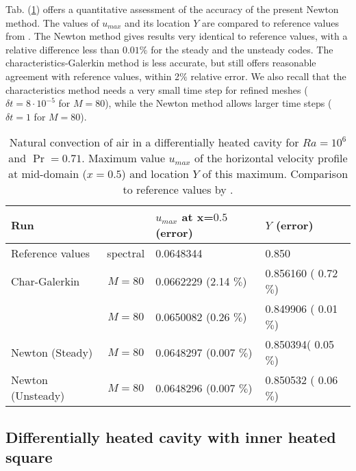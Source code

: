 Tab. (\ref{tab-valid-natconv}) offers a quantitative assessment of the accuracy of the present Newton method. 
The values of $u_{max}$  and its location $Y$ are compared to reference values from \cite{LeQuere91}. 
The Newton method gives results very identical to reference values, with a relative difference less than $0.01 \%$ for the steady and the unsteady codes. 
The characteristics-Galerkin method is less accurate, but still offers reasonable agreement with reference values, within 2$\%$ relative error. 
We also recall that the characteristics method needs a very small time step for refined meshes ($\delta t = 8\cdot 10^{-5}$ for $M=80$), while the Newton method allows larger time steps ($\delta t = 1$ for $M=80$). %
\begin{table}%
	\begin{center}
		\begin{tabular}{|l|c|l|l|}
			\hline
			\multicolumn{2}{|l|}{Run} & $u_{max}$ at x=$0.5$ (error) & $Y$ (error) \\
			\hline
			Reference values & spectral & 0.0648344           & 0.850 \\ \hline
			Char-Galerkin       &$M=80$ & 0.0662229 (2.14 $\%$) & 0.856160 ( 0.72 $\%$) \\ \hline
			\cite{dan-2014-JCP}              &$M=80$ & 0.0650082 (0.26 $\%$) & 0.849906 ( 0.01 $\%$) \\ \hline
			Newton (Steady)        &$M=80$ & 0.0648297 (0.007 $\%$) & 0.850394( 0.05 $\%$) \\ \hline
			Newton (Unsteady)        &$M=80$ & 0.0648296 (0.007 $\%$) & 0.850532 ( 0.06 $\%$) \\ \hline
		\end{tabular}
	\end{center}
	\caption {Natural convection of air in a differentially heated cavity for $Ra = 10^6$ and $\Pr = 0.71$. Maximum value $u_{max}$ of the horizontal velocity profile at mid-domain ($x=0.5$) and location $Y$ of this maximum. Comparison to reference values by \cite{LeQuere91}.}
	\label{tab-valid-natconv}
\end{table}

\subsection{Differentially heated cavity with inner heated square} \label{sub-2D-OBSTACLE}

